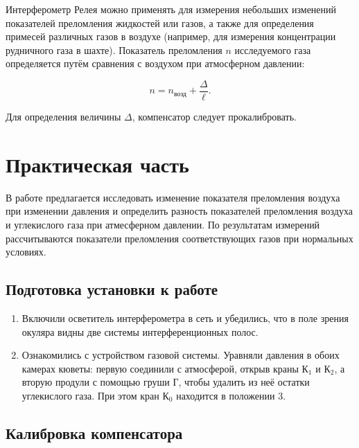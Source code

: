 \documentclass[a4paper,12pt]{article} %
\begin{document}
Интерферометр Релея можно применять для измерения небольших изменений показателей преломления жидкостей или газов, а также для определения примесей различных газов в воздухе (например, для измерения концентрации рудничного газа в шахте). Показатель преломления $n$ исследуемого газа определяется путём сравнения с воздухом при атмосферном давлении:

\[ n = n_{\text{возд}} + \frac{\Delta}{\ell}. \]

Для определения величины $\Delta$, компенсатор следует прокалибровать.

\section{Практическая часть}

В работе предлагается исследовать изменение показателя преломления воздуха при изменении давления и определить разность показателей преломления воздуха и углекислого газа при атмесферном давлении. По результатам измерений рассчитываются показатели преломления соответствующих газов при нормальных условиях.

\subsection{Подготовка установки к работе}

\begin{enumerate}
    \item Включили осветитель интерферометра в сеть и убедились, что в поле зрения окуляра видны две системы интерференционных полос.
    \item Ознакомились с устройством газовой системы. Уравняли давления в обоих камерах кюветы: первую соединили с атмосферой, открыв краны $\text{К}_1$ и $\text{К}_2$, а вторую продули с помощью груши $\text{Г}$, чтобы удалить из неё остатки углекислого газа. При этом кран $\text{К}_0$ находится в положении $3$.  
\end{enumerate}

\subsection{Калибровка компенсатора}
\end{document}
